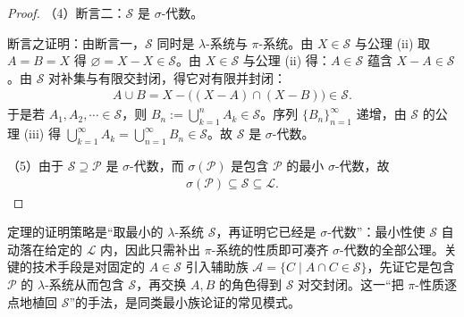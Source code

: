 \documentclass[../../main.tex]{subfiles}
\begin{document}
\begin{proof}
（4）断言二：$\mathcal{S}$ 是 $\sigma$-代数。

断言之证明：由断言一，$\mathcal{S}$ 同时是 $\lambda$-系统与 $\pi$-系统。由 $X\in\mathcal{S}$ 与公理 (ii) 取 $A=B=X$ 得 $\varnothing=X-X\in\mathcal{S}$。由 $X\in\mathcal{S}$ 与公理 (ii) 得：$A\in\mathcal{S}$ 蕴含 $X-A\in\mathcal{S}$。由 $\mathcal{S}$ 对补集与有限交封闭，得它对有限并封闭：
\begin{align*}
A\cup B=X-\bigl((X-A)\cap(X-B)\bigr)\in\mathcal{S}.
\end{align*}
于是若 $A_{1},A_{2},\cdots\in\mathcal{S}$，则 $B_{n}:=\bigcup_{k=1}^{n}A_{k}\in\mathcal{S}$。序列 $\{B_{n}\}_{n=1}^{\infty}$ 递增，由 $\mathcal{S}$ 的公理 (iii) 得 $\bigcup_{k=1}^{\infty}A_{k}=\bigcup_{n=1}^{\infty}B_{n}\in\mathcal{S}$。故 $\mathcal{S}$ 是 $\sigma$-代数。

（5）由于 $\mathcal{S}\supseteq\mathcal{P}$ 是 $\sigma$-代数，而 $\sigma(\mathcal{P})$ 是包含 $\mathcal{P}$ 的最小 $\sigma$-代数，故
\begin{align*}
\sigma(\mathcal{P})\subseteq\mathcal{S}\subseteq\mathcal{L}.
\end{align*}
\end{proof}

\begin{remark}\label{remark:ch01-thm-1-4-动机}
定理的证明策略是“取最小的 $\lambda$-系统 $\mathcal{S}$，再证明它已经是 $\sigma$-代数”：最小性使 $\mathcal{S}$ 自动落在给定的 $\mathcal{L}$ 内，因此只需补出 $\pi$-系统的性质即可凑齐 $\sigma$-代数的全部公理。关键的技术手段是对固定的 $A\in\mathcal{S}$ 引入辅助族 $\mathcal{A}=\{C\mid A\cap C\in\mathcal{S}\}$，先证它是包含 $\mathcal{P}$ 的 $\lambda$-系统从而包含 $\mathcal{S}$，再交换 $A,B$ 的角色得到 $\mathcal{S}$ 对交封闭。这一“把 $\pi$-性质逐点地植回 $\mathcal{S}$”的手法，是同类最小族论证的常见模式。
\end{remark}
\end{document}

